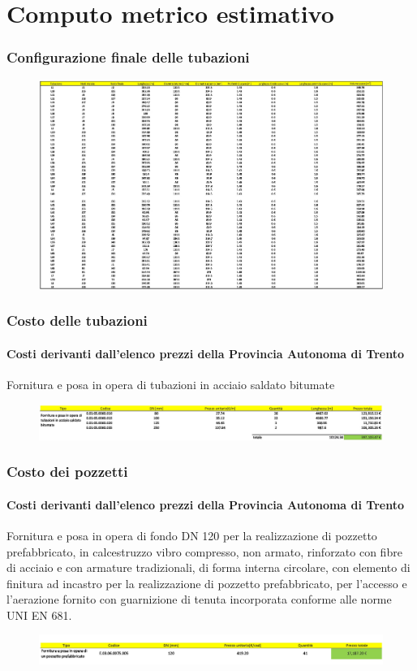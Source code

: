 \documentclass{beamer}
\newcommand{\nologo}{\setbeamertemplate{logo}{}}
\begin{document}
\section{Computo metrico estimativo}
{\nologo
\begin{frame}
	\frametitle{Configurazione finale delle tubazioni}
	\begin{figure}
	 \centering
	 \includegraphics[width=\textwidth]{images/condotte}
	\end{figure}
\end{frame}
}
%
\begin{frame}
	\frametitle{Costo delle tubazioni}
	\framesubtitle{Costi derivanti dall'elenco prezzi della Provincia Autonoma di Trento}
	Fornitura e posa in opera di tubazioni in acciaio saldato bitumate
	\begin{figure}
	 \centering
	 \includegraphics[width=\textwidth]{images/costo_condotte}
	\end{figure}
\end{frame}
%
\begin{frame}
	\frametitle{Costo dei pozzetti}
	\framesubtitle{Costi derivanti dall'elenco prezzi della Provincia Autonoma di Trento}
	Fornitura e posa in opera di fondo DN 120 per la realizzazione di pozzetto prefabbricato, in calcestruzzo vibro compresso, non armato, rinforzato con fibre di acciaio e con armature tradizionali, di forma interna circolare, con elemento di finitura ad incastro per la realizzazione di pozzetto prefabbricato, per l'accesso e l'aerazione fornito con guarnizione di tenuta incorporata conforme alle norme UNI EN 681.
	\begin{figure}
	 \centering
	 \includegraphics[width=\textwidth]{images/costo_pozzetti}
	\end{figure}
\end{frame}
\end{document}
